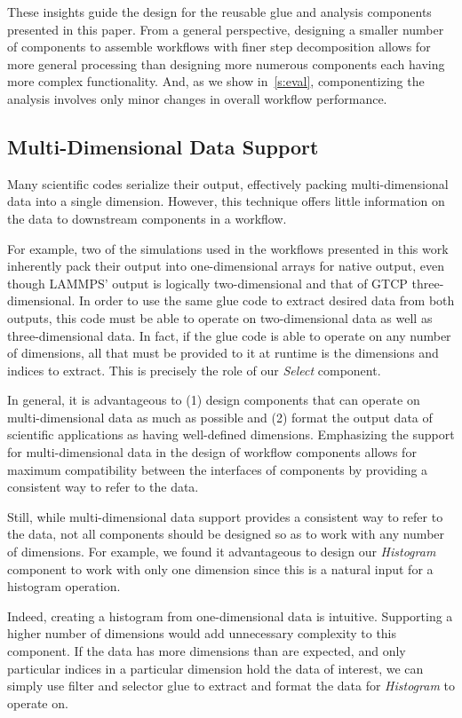These insights guide the design for the
reusable glue and analysis
components presented in this
paper. From a general perspective, designing a smaller number of
components to assemble workflows with finer step decomposition
allows for more general processing
than designing more numerous components each having more
complex functionality.
And, as we show in~\autoref{s:eval}, componentizing
the analysis involves only minor changes
in overall workflow performance.

\subsection{Multi-Dimensional Data Support}

Many scientific codes serialize their output, effectively packing
multi-dimensional data into a single dimension.
However, this technique offers
little information on the data to downstream
components in a workflow.

For example, two of the simulations used in the
workflows presented in this work inherently
pack their output into one-dimensional arrays
for native output, even
though LAMMPS' output is logically
two-dimensional and that
of GTCP three-dimensional.
In order to use the same glue code to
extract desired data from both outputs,
this code must be able to operate on two-dimensional data
as well as three-dimensional data.
In fact, if the glue code is able to operate
on any number of dimensions, all that must be provided to it
at runtime is the dimensions and indices to extract.
This is precisely the role of our
{\em Select} component.

In general, it is advantageous to (1) design
components that can operate on
multi-dimensional data as much as possible
and (2) format the output data of
scientific applications as having well-defined
dimensions. Emphasizing the support for multi-dimensional
data in the design of workflow components allows
for maximum compatibility between the interfaces
of components by providing a
consistent way to refer to the data.

Still, while multi-dimensional data support
provides a consistent way to refer
to the data, not all components should be
designed so as to work with
any number of dimensions.
For example, we found it advantageous to
design our {\em Histogram} component to work with
only one dimension since this is
a natural input for a histogram operation.

Indeed, creating a histogram from one-dimensional data is intuitive.
Supporting a higher number of dimensions
would add unnecessary complexity
to this component. If the data has more
dimensions than are expected,
and only particular indices in a particular
dimension hold the data of interest,
we can simply use filter and selector
glue to extract and format the data for
{\em Histogram} to operate on.
\fi

